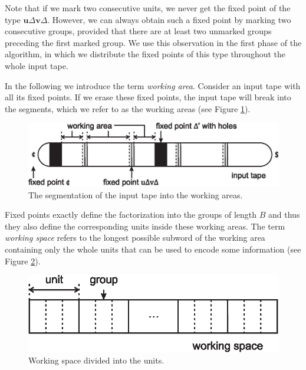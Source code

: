 Note that if we mark two consecutive units, we never get the fixed point of the type $\mathbf{u} \Delta \mathbf{v} \Delta$. However, we can always obtain such a fixed point by marking two consecutive groups, provided that there are at least two unmarked groups preceding the first marked group. We use this observation in the first phase of the algorithm, in which we distribute the fixed points of this type throughout the whole input tape.

In the following we introduce the term \emph{working area}. Consider an input tape with all its fixed points. If we erase these fixed points, the input tape will break into the segments, which we refer to as the working areas (see Figure \ref{figure:tape}).

\begin{figure}[htp]
\centering
\includegraphics[scale=1.0]{img/tape.eps}
\caption[The segmentation of the input tape into the working areas.]
{The segmentation of the input tape into the working areas.}
\label{figure:tape}
\end{figure}

Fixed points exactly define the factorization into the groups of length $B$ and thus they also define the corresponding units inside these working areas. The term \emph{working space} refers to the longest possible subword of the working area containing only the whole units that can be used to encode some information (see Figure \ref{figure:working_space}).

\begin{figure}[htp]
\centering
\includegraphics[scale=1.0]{img/working_space.eps}
\caption[Working space divided into the units.]
{Working space divided into the units.}
\label{figure:working_space}
\end{figure}

